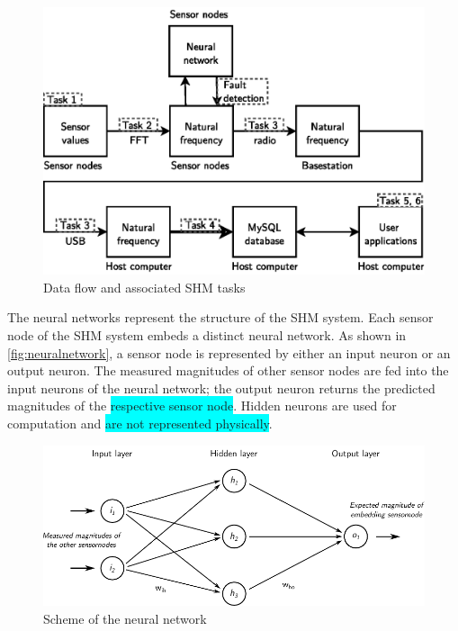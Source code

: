\documentclass[12pt,a4paper]{scrartcl}
\begin{document}
\begin{figure}[hbt]
    \centering
    \includegraphics[scale=0.9]{figures/dataflow_tasks_nn.eps}
    \caption{Data flow and associated SHM tasks}
    \label{fig:flow}
\end{figure}


The neural networks represent the structure of the SHM system.
Each sensor node of the SHM system embeds a distinct neural network. As shown in \autoref{fig:neuralnetwork}, a sensor node is represented by either an input neuron or an output neuron.
The measured magnitudes of other sensor nodes are fed into the input neurons of the neural network; the output neuron returns the predicted magnitudes of the \colorbox{cyan}{respective sensor node}.
Hidden neurons are used for computation and \colorbox{cyan}{are not represented physically}.

\begin{figure}[hbt]
    \centering
    \includegraphics{figures/neuralnetwork.pdf}
    \caption{Scheme of the neural network}
    \label{fig:neuralnetwork}
\end{figure}
\end{document}
